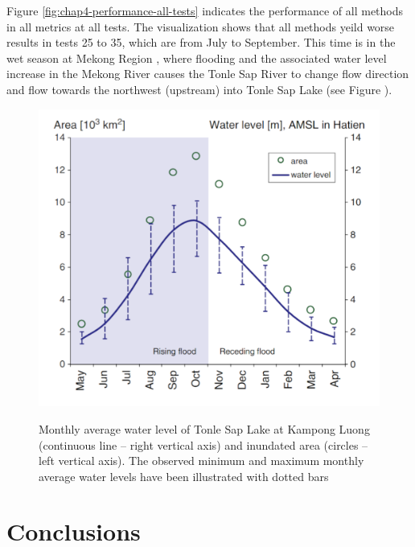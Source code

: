 Figure \ref{fig:chap4-performance-all-tests} indicates the performance of all methods in all metrics at all tests. The visualization shows that all methods yeild worse results in tests 25 to 35, which are from July to September. This time is in the wet season at Mekong Region %
, where flooding and the associated water level increase in the Mekong River causes the Tonle Sap River to change flow direction and flow towards the northwest (upstream) into Tonle Sap Lake (see Figure ).

\begin{figure}
    \caption[]{Monthly average water level of Tonle Sap Lake at Kampong Luong (continuous line – right vertical axis) and inundated area (circles – left vertical axis). The observed minimum and maximum monthly average water levels have been illustrated with dotted bars}
    \includegraphics[width=.65\textwidth]{figures/chap4/tonlesap_avg_area_with_floodplain.png}
    \label{fig:chap4-tonlesap-avg-area}
\end{figure}


\section{Conclusions}

